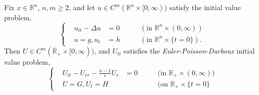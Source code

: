 \documentclass{article}
\begin{document}
\begin{lemma}
	Fix $x \in\mathbb{R}^{n}$, $n, m \geq 2$, and let $u \in C^{m}(\mathbb{R}^{n} \times [0, \infty))$ satisfy the initial value problem, 
	\begin{equation*}
		\left\{
		\begin{alignedat}{3}
			&u_{tt} - \Delta u &= 0 &\qquad (\text{in $\mathbb{R}^{n} \times (0,\infty)$}) \\
			&u = g, u_{t} &= h &\qquad (\text{in $\mathbb{R}^{n} \times \{t = 0\}$}). 
		\end{alignedat}
		\right. 
	\end{equation*}
	Then $U \in C^{m}(\overline{\mathbb{R}}_{+} \times [0,\infty))$, and $U_{tt}$ satisfies the \textit{Euler-Poisson-Darboux} initial value problem, 
	\begin{equation}
		\left\{
		\begin{alignedat}{3}
			&U_{tt} - U_{rr} - \frac{n-1}{r}U_{r} &= 0 & \qquad (\text{in $\mathbb{R}_{+} \times (0,\infty)$)} \\
			&U = G, U_{t} = H& &\qquad (\text{on $\mathbb{R}_{+} \times \{t = 0\}$}
		\end{alignedat}
		\right. 
	\end{equation}
\end{lemma}
\end{document}
